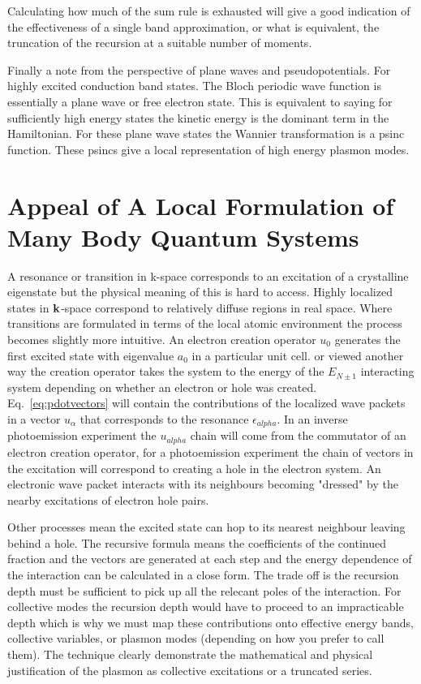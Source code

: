 \documentclass{article}
\def\k{{\bf k}}
\begin{document}
Calculating how much of the sum rule is exhausted will give a good indication
of the effectiveness of a single band approximation, or what is equivalent,
the truncation of the recursion at a suitable number of moments.

Finally a note from the perspective of plane waves and pseudopotentials. For
highly excited conduction band states. The Bloch periodic wave function is
essentially a plane wave or free electron state. This is equivalent to saying for
sufficiently high energy states the kinetic energy is the dominant term in the Hamiltonian.
For these plane wave states the Wannier transformation is a psinc function. These psincs
give a local representation of high energy plasmon modes.

\section{Appeal of A Local Formulation of Many Body Quantum Systems}
 A resonance or transition in k-space corresponds to an excitation 
of a crystalline eigenstate but the physical meaning of this is hard to access. Highly
localized states in $\k$-space correspond to relatively diffuse regions in real space. Where
transitions are formulated in terms of the local atomic environment the process becomes slightly
more intuitive. An electron creation operator $u_{0}$ generates the 
first excited state with eigenvalue $a_{0}$ in a particular unit cell. 
or viewed another way the creation operator takes the system to the energy 
of the $E_{N\pm1}$ interacting system depending on whether an electron or hole
was created. Eq.~\ref{eq:pdotvectors} will contain the contributions of the localized
wave packets in a vector $u_{\alpha}$ that corresponds to the resonance 
$\epsilon_{alpha}$. In an inverse photoemission experiment the $u_{alpha}$ chain
will come from the commutator of an electron creation operator, for a photoemission
experiment the chain of vectors in the excitation will correspond to creating a hole
in the electron system. An electronic wave packet interacts with its neighbours becoming
"dressed" by the nearby excitations of electron hole pairs.

Other processes mean the excited state can hop 
to its nearest neighbour leaving behind a hole. The recursive formula means
the coefficients of the continued fraction and the vectors are generated at
each step and the energy dependence of the interaction can be calculated 
in a close form. The trade off is the recursion depth must be sufficient to
pick up all the relecant poles of the interaction. For collective modes
the recursion depth would have to proceed to an impracticable depth which
is why we must map these contributions onto effective energy bands, collective
variables, or plasmon modes (depending on how you prefer to call them). The technique
clearly demonstrate the mathematical and physical justification of the plasmon as
collective excitations or a truncated series.
\end{document}

